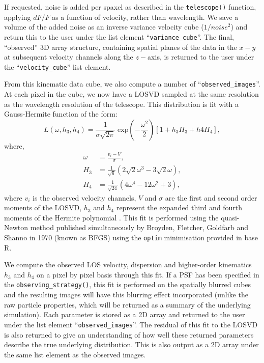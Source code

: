 \documentclass[
  journal=pasa,
  manuscript=research-paper, %
  year=2020,
  volume=37,
]{cup-journal}
\newcommand{\telescope}[1]{\texttt{telescope()}#1}
\newcommand{\observingstrategy}[1]{\texttt{observing\_strategy()}#1}
\begin{document}
If requested, noise is added per spaxel as described in the \telescope{} function, applying $dF/F$ as a function of velocity, rather than wavelength. 
We save a volume of the added noise as an inverse variance velocity cube ($1/noise^{2}$) and return this to the user under the list element ``\texttt{variance\_cube}''. 
The final, ``observed'' 3D array structure, containing spatial planes of the data in the $x-y$ at subsequent velocity channels along the $z-$axis, is returned to the user under the ``\texttt{velocity\_cube}'' list element. 

From this kinematic data cube, we also compute a number of ``\texttt{observed\_images}''. 
At each pixel in the cube, we now have a LOSVD sampled at the same resolution as the wavelength resolution of the telescope. 
This distribution is fit with a Gauss-Hermite function of the form:
\begin{equation}
    L(\omega, h_3, h_4) = \frac{1}{\sigma\sqrt{2\pi}} \; \text{exp}\left(-\frac{\omega^2}{2} \right) \left[ 1 + h_3 H_3 + h4 H_4 \right],
\end{equation}
where,
\begin{align}
    \omega &= \frac{v_i - V}{\sigma}, \\
    H_3 &= \frac{1}{\sqrt{6}} \left( 2\sqrt{2} \omega^3 - 3\sqrt{2} \omega \right), \\
    H_4 &= \frac{1}{\sqrt{24}}\left( 4 \omega^4 - 12 \omega^2 + 3 \right),
\end{align}
where $v_i$ is the observed velocity channels, $V$ and $\sigma$ are the first and second order moments of the LOSVD, $h_3$ and $h_4$ represent the expanded third and fourth moments of the Hermite polynomial \citep{vanderMarel1993AGalaxies, Cappellari2017ImprovingFunctions}.
This fit is performed using the quasi-Newton method published simultaneously by  Broyden, Fletcher, Goldfarb and Shanno in 1970 (known as BFGS) \citep{Broyden1970BFGS, Fletcher1970BFGS, Goldfarb1970BFGS, Shanno1970BFGS} using the \texttt{optim} minimisation provided in base R. 

We compute the observed LOS velocity, dispersion and higher-order kinematics $h_3$ and $h_4$ on a pixel by pixel basis through this fit. 
If a PSF has been specified in the \observingstrategy, this fit is performed on the spatially blurred cubes and the resulting images will have this blurring effect incorporated (unlike the raw particle properties, which will be returned as a summary of the underlying simulation). 
Each parameter is stored as a 2D array and returned to the user under the list element ``\texttt{observed\_images}''.
The residual of this fit to the LOSVD is also returned to give an understanding of how well these returned parameters describe the true underlying distribution.
This is also output as a 2D array under the same list element as the observed images. 
\end{document}
